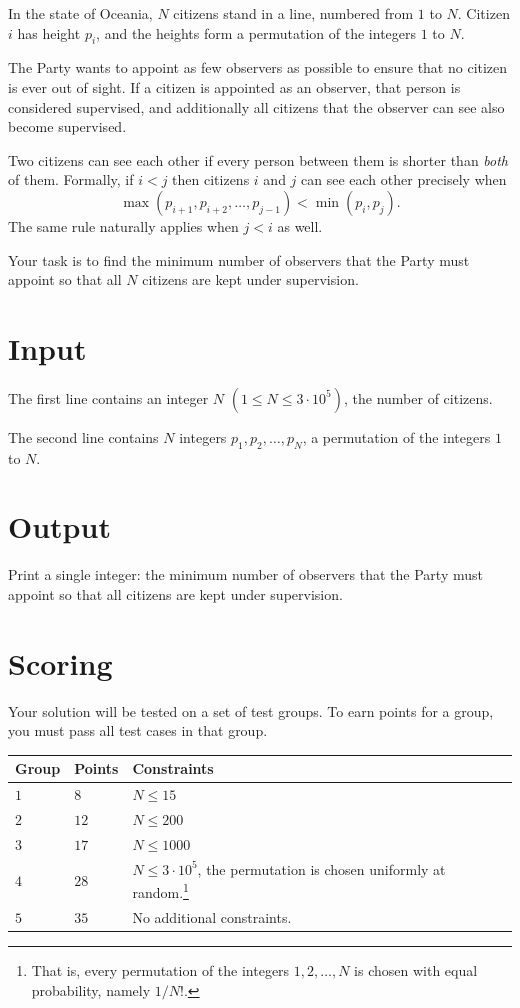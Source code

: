\noindent

In the state of Oceania, $N$ citizens stand in a line, numbered from $1$ to $N$.
Citizen $i$ has height $p_i$, and the heights form a permutation of the integers $1$ to $N$.

The Party wants to appoint as few observers as possible to ensure that no citizen is ever out of sight.
If a citizen is appointed as an observer, that person is considered supervised, and additionally all citizens that the observer can see also become supervised.

Two citizens can see each other if every person between them is shorter than \emph{both} of them.
Formally, if $i < j$ then citizens $i$ and $j$ can see each other precisely when
\[
\max(p_{i+1}, p_{i+2}, \dots, p_{j-1}) < \min(p_i, p_j).
\]
The same rule naturally applies when $j < i$ as well.

Your task is to find the minimum number of observers that the Party must appoint so that all $N$ citizens are kept under supervision.

\section*{Input}

The first line contains an integer $N$ $(1 \leq N \leq 3 \cdot 10^5)$, the number of citizens.

The second line contains $N$ integers $p_1, p_2, \dots, p_N$, a permutation of the integers $1$ to $N$.

\section*{Output}

Print a single integer: the minimum number of observers that the Party must appoint so that all citizens are kept under supervision.

\section*{Scoring}
Your solution will be tested on a set of test groups.
To earn points for a group, you must pass all test cases in that group.

\noindent
\begin{tabular}{| l | l | p{12cm} |}
  \hline
  \textbf{Group} & \textbf{Points} & \textbf{Constraints} \\ \hline
  $1$ & $8$ & $N \leq 15$ \\ \hline
  $2$ & $12$ & $N \leq 200$ \\ \hline
  $3$ & $17$ & $N \leq 1000$ \\ \hline
  $4$ & $28$ & $N \leq 3 \cdot 10^5$, the permutation is chosen uniformly at random.\footnote{That is, every permutation of the integers $1,2,\dots,N$ is chosen with equal probability, namely $1/N!$.}
 \\ \hline
  $5$ & $35$ & No additional constraints. \\ \hline
\end{tabular}

